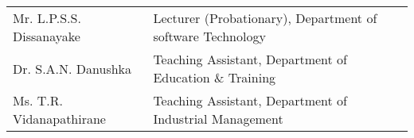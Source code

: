 \begin{longtable}{ L{4.8cm}  L{6.5cm} }
         

           Mr. L.P.S.S. Dissanayake & Lecturer (Probationary), Department of  software Technology \\

          

       

       

          

         

            
             

          

            

               Dr. S.A.N. Danushka & Teaching Assistant, Department of Education \& Training \\

             Ms. T.R. Vidanapathirane & Teaching Assistant, Department of Industrial Management \\

             

             

            
            
   

    
    
   
    
   
   
   
    
   
    
  
\end{longtable}



\newpage
\singlespacing